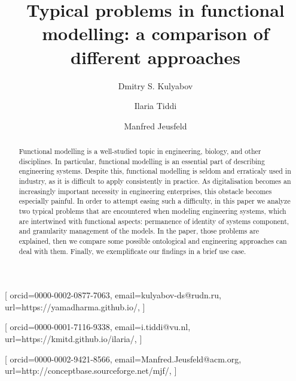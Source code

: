 \documentclass[
]{ceurart}
\begin{document}


\title{Typical problems in functional modelling: a comparison of different approaches}

\tnotemark[1]

\author[1,2]{Dmitry S. Kulyabov}[%
orcid=0000-0002-0877-7063,
email=kulyabov-ds@rudn.ru,
url=https://yamadharma.github.io/,
]
\cormark[1]
\fnmark[1]
\address[1]{ISTC-CNR Laboratory for Applied Ontology, via alla cascata 56/C, 38123, Povo, Italy}
\address[2]{Adige S.P.A, via per Barco, 11, Levico Terme, 38056, Italy}

\author[1]{Ilaria Tiddi}[%
orcid=0000-0001-7116-9338,
email=i.tiddi@vu.nl,
url=https://kmitd.github.io/ilaria/,
]
\fnmark[1]

\author[1]{Manfred Jeusfeld}[%
orcid=0000-0002-9421-8566,
email=Manfred.Jeusfeld@acm.org,
url=http://conceptbase.sourceforge.net/mjf/,
]
\fnmark[1]


\begin{abstract}
  Functional modelling is a well-studied topic in engineering, biology, and other disciplines. 
  In particular, functional modelling is an essential part of describing engineering systems.
  Despite this, functional modelling is seldom and erraticaly used in industry, as it is difficult to apply consistently in practice.
  As digitalisation becomes an increasingly important necessity in engineering enterprises, this obstacle becomes especially painful.
  In order to attempt easing such a difficulty, in this paper we analyze two typical problems that are encountered when modeling engineering systems, which are intertwined with functional aspects: permanence of identity of systems component, and granularity management of the models.
  In the paper, those problems are explained, then we compare some possible ontological and engineering approaches can deal with them.
  Finally, we exemplificate our findings in a brief use case.
  \TODO{[S: va sistemato]}
\end{abstract}
\end{document}
